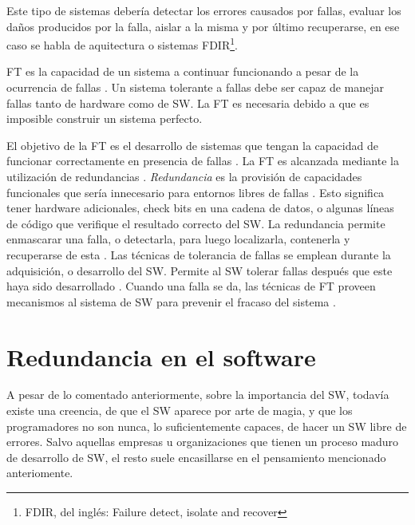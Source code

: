 Este tipo de sistemas debería detectar los errores causados por fallas, evaluar los daños 
producidos por la falla, aislar a la misma y por último recuperarse, en ese caso se habla de 
aquitectura o sistemas \acs{FDIR}\footnote{FDIR, del inglés: Failure detect, isolate and recover}.

\ac{FT} es la capacidad de un sistema a continuar funcionando a pesar de la ocurrencia 
de fallas \citep{FTDesign}. Un sistema tolerante a fallas debe ser capaz de manejar fallas tanto de 
hardware como de \ac{SW}. La \ac{FT} es necesaria debido a que es imposible construir 
un sistema perfecto.

El objetivo de la \ac{FT} es el desarrollo de sistemas que tengan la capacidad de
funcionar correctamente en 
presencia de fallas \citep{FTDesign}. La \ac{FT} es alcanzada mediante la utilización de redundancias \citep{FTDesign}. \textit{Redundancia} es la provisión de capacidades 
funcionales que sería innecesario para entornos libres de fallas \citep{FTDesign}. Esto significa 
tener hardware adicionales, check bits en una cadena de datos, o algunas l\'ineas de c\'odigo que 
verifique el resultado correcto del \ac{SW}. La redundancia permite enmascarar una falla, o 
detectarla, para luego localizarla, contenerla y recuperarse de esta \citep{FTDesign}. Las 
técnicas de tolerancia de fallas se emplean durante la adquisición, o desarrollo del \ac{SW}. 
Permite al \ac{SW} tolerar fallas después que este haya sido desarrollado \citep{Pullum01}. Cuando 
una falla se da, las técnicas de \ac{FT} proveen mecanismos al sistema de \ac{SW} para prevenir el 
fracaso del sistema \citep{Pullum01}.


\section{Redundancia en el software}\label{sec:redundancias_sw}
A pesar de lo comentado anteriormente, sobre la importancia del \ac{SW}, todavía existe una 
creencia, de que el \ac{SW} aparece por arte de magia, y que los programadores no son nunca, lo 
suficientemente capaces, de hacer un \ac{SW} libre de errores. Salvo aquellas empresas u 
organizaciones que tienen un proceso maduro de desarrollo de \ac{SW}, el resto suele encasillarse
en el pensamiento mencionado anteriomente. 

